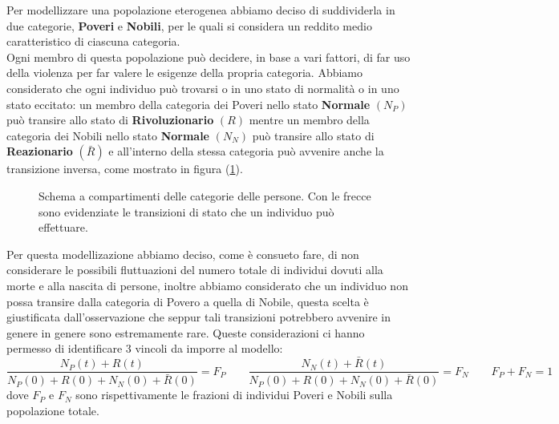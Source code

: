 Per modellizzare una popolazione eterogenea abbiamo deciso di suddividerla in due categorie, \textbf{Poveri} e \textbf{Nobili}, per le quali si considera un reddito medio caratteristico di ciascuna categoria.\\
Ogni membro di questa popolazione può decidere, in base a vari fattori, di far uso della violenza per far valere le esigenze della propria categoria. Abbiamo considerato che ogni individuo può trovarsi o in uno stato di normalità o in uno stato eccitato: un membro della categoria dei Poveri nello stato \textbf{Normale} $(N_P)$ può transire allo stato di \textbf{Rivoluzionario} $(R)$ mentre un membro della categoria dei Nobili nello stato \textbf{Normale} $(N_N)$ può transire allo stato di \textbf{Reazionario} $(\bar{R})$ e all'interno della stessa categoria può avvenire anche la transizione inversa, come mostrato in figura (\ref{fig:CompartmentScheme}).\\
\begin{figure}[H]
	\centering
	\label{fig:CompartmentScheme}
	\caption{Schema a compartimenti delle categorie delle persone. Con le frecce sono evidenziate le transizioni di stato che un individuo può effettuare.}
\end{figure}
Per questa modellizazione abbiamo deciso, come è consueto fare, di non  considerare le possibili fluttuazioni del numero totale di individui dovuti alla morte e alla nascita di persone, inoltre abbiamo considerato che un individuo non possa transire dalla categoria di Povero a quella di Nobile, questa scelta è giustificata dall'osservazione che seppur tali transizioni potrebbero avvenire in genere in genere sono estremamente rare. Queste considerazioni ci hanno permesso di identificare 3 vincoli da imporre al modello:
\begin{equation}
    \frac{N_P(t)+R(t)}{N_P(0)+R(0)+N_N(0)+\bar{R}(0)}=F_P \qquad\frac{N_N(t)+\bar{R}(t)}{N_P(0)+R(0)+N_N(0)+\bar{R}(0)}=F_N \qquad F_P+F_N=1 
	\label{vincoli}
\end{equation}
dove $F_P$ e $F_N$ sono rispettivamente le frazioni di individui Poveri e Nobili sulla popolazione totale.\\

